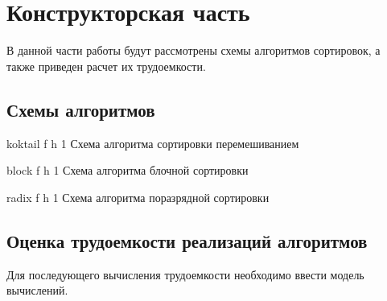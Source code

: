 \chapter{Конструкторская часть}
В данной части работы будут рассмотрены схемы алгоритмов сортировок, а также приведен расчет их трудоемкости.





\section{Схемы алгоритмов}
{koktail} %
{f} %
{h} %
{1\textwidth} %
{Схема алгоритма сортировки перемешиванием} %



{block} %
{f} %
{h} %
{1\textwidth} %
{Схема алгоритма блочной сортировки} %


{radix} %
{f} %
{h} %
{1\textwidth} %
{Схема алгоритма поразрядной сортировки} %




\section{Оценка трудоемкости реализаций алгоритмов}
Для последующего вычисления трудоемкости необходимо ввести модель вычислений.

